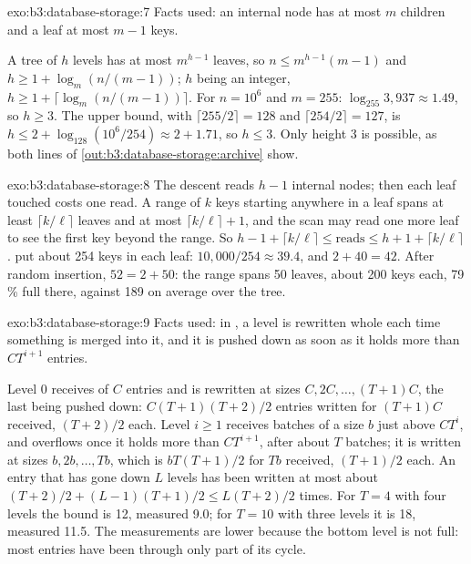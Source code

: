 \begin{solution}{exo:b3:database-storage:7}
Facts used: an internal node has at most $m$ children and a leaf at most $m - 1$ keys.

A tree of $h$ levels has at most $m^{h-1}$ leaves, so $n \le m^{h-1}(m-1)$ and $h \ge 1 + \log_m (n/(m-1))$; $h$ being an integer, $h \ge 1 + \lceil \log_m (n/(m-1)) \rceil$. For $n = 10^6$ and $m = 255$: $\log_{255} 3{,}937 \approx 1.49$, so $h \ge 3$. The upper bound, with $\lceil 255/2 \rceil = 128$ and $\lceil 254/2 \rceil = 127$, is $h \le 2 + \log_{128}(10^6/254) \approx 2 + 1.71$, so $h \le 3$. Only height 3 is possible, as both lines of \cref{out:b3:database-storage:archive} show.
\end{solution}

\begin{solution}{exo:b3:database-storage:8}
The descent reads $h - 1$ internal nodes; then each leaf touched costs one read. A range of $k$ keys starting anywhere in a leaf spans at least $\lceil k/\ell \rceil$ leaves and at most $\lceil k/\ell \rceil + 1$, and the scan may read one more leaf to see the first key beyond the range. So $h - 1 + \lceil k/\ell \rceil \le \text{reads} \le h + 1 + \lceil k/\ell \rceil$.  put about 254 keys in each leaf: $10{,}000/254 \approx 39.4$, and $2 + 40 = 42$. After random insertion, $52 = 2 + 50$: the range spans 50 leaves, about 200 keys each, 79\,\% full there, against 189 on average over the tree.
\end{solution}

\begin{solution}{exo:b3:database-storage:9}
Facts used: in , a level is rewritten whole each time something is merged into it, and it is pushed down as soon as it holds more than $C T^{i+1}$ entries.

Level 0 receives  of $C$ entries and is rewritten at sizes $C, 2C, \ldots, (T+1)C$, the last being pushed down: $C(T+1)(T+2)/2$ entries written for $(T+1)C$ received, $(T+2)/2$ each. Level $i \ge 1$ receives batches of a size $b$ just above $C T^i$, and overflows once it holds more than $C T^{i+1}$, after about $T$ batches; it is written at sizes $b, 2b, \ldots, Tb$, which is $b T(T+1)/2$ for $T b$ received, $(T+1)/2$ each. An entry that has gone down $L$ levels has been written at most about $(T+2)/2 + (L-1)(T+1)/2 \le L(T+2)/2$ times. For $T = 4$ with four levels the bound is 12, measured 9.0; for $T = 10$ with three levels it is 18, measured 11.5. The measurements are lower because the bottom level is not full: most entries have been through only part of its cycle.
\end{solution}

